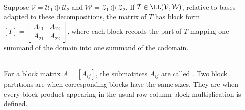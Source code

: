 \begin{definition} \\
Suppose $\mathcal{V} = \mathcal{U}_1 \oplus \mathcal{U}_2$ and $\mathcal{W} = \mathcal{Z}_1 \oplus \mathcal{Z}_2$. If $T \in \LL(\mathcal{V}, \mathcal{W})$, relative to bases adapted to these decompositions, the matrix of $T$ has block form $[T] =
\begin{bmatrix}
A_{11} & A_{12} \\
A_{21} & A_{22}
\end{bmatrix}$,
where each block records the part of $T$ mapping one summand of the domain into one summand of the codomain.
\end{definition}

\begin{definition} \\
For a block matrix $A=[A_{ij}]$, the submatrices $A_{ij}$ are called . Two block partitions are  when corresponding blocks have the same sizes. They are  when every block product appearing in the usual row-column block multiplication is defined.
\end{definition}

